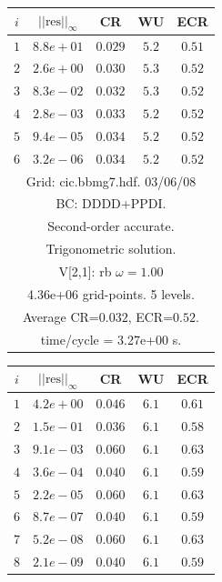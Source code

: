 \begin{table}[hbt]
\begin{center}
{\tablefontsize
\begin{tabular}{|c|c|c|c|c|} \hline 
 $i$   & $\vert\vert\mbox{res}\vert\vert_\infty$  &  CR     &  WU    & ECR  \\   \hline 
 $ 1$  & $ 8.8e+01$ & $0.029$ & $ 5.2$ & $0.51$ \\ 
 $ 2$  & $ 2.6e+00$ & $0.030$ & $ 5.3$ & $0.52$ \\ 
 $ 3$  & $ 8.3e-02$ & $0.032$ & $ 5.3$ & $0.52$ \\ 
 $ 4$  & $ 2.8e-03$ & $0.033$ & $ 5.2$ & $0.52$ \\ 
 $ 5$  & $ 9.4e-05$ & $0.034$ & $ 5.2$ & $0.52$ \\ 
 $ 6$  & $ 3.2e-06$ & $0.034$ & $ 5.2$ & $0.52$ \\ 
\hline 
\multicolumn{5}{|c|}{Grid: cic.bbmg7.hdf. 03/06/08}  \\
\multicolumn{5}{|c|}{BC: DDDD+PPDI.}  \\
\multicolumn{5}{|c|}{Second-order accurate.}  \\
\multicolumn{5}{|c|}{Trigonometric solution.}  \\
\multicolumn{5}{|c|}{V[2,1]: rb $\omega=1.00$}  \\
\multicolumn{5}{|c|}{4.36e+06 grid-points. 5 levels.}  \\
\multicolumn{5}{|c|}{Average CR=$0.032$, ECR=$0.52$.}  \\
\multicolumn{5}{|c|}{time/cycle = 3.27e+00 s.}  \\
\hline 
\end{tabular}
\begin{tabular}{|c|c|c|c|c|} \hline 
 $i$   & $\vert\vert\mbox{res}\vert\vert_\infty$  &  CR     &  WU    & ECR  \\   \hline 
 $ 1$  & $ 4.2e+00$ & $0.046$ & $ 6.1$ & $0.61$ \\ 
 $ 2$  & $ 1.5e-01$ & $0.036$ & $ 6.1$ & $0.58$ \\ 
 $ 3$  & $ 9.1e-03$ & $0.060$ & $ 6.1$ & $0.63$ \\ 
 $ 4$  & $ 3.6e-04$ & $0.040$ & $ 6.1$ & $0.59$ \\ 
 $ 5$  & $ 2.2e-05$ & $0.060$ & $ 6.1$ & $0.63$ \\ 
 $ 6$  & $ 8.7e-07$ & $0.040$ & $ 6.1$ & $0.59$ \\ 
 $ 7$  & $ 5.2e-08$ & $0.060$ & $ 6.1$ & $0.63$ \\ 
 $ 8$  & $ 2.1e-09$ & $0.040$ & $ 6.1$ & $0.59$ \\ 

\end{tabular}}
\end{center}
\end{table}
